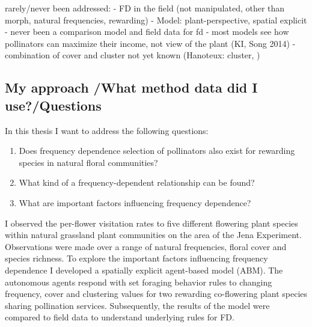 rarely/never been addressed: 
- FD in the field (not manipulated, other than morph, natural frequencies, rewarding)
- Model: plant-perspective, spatial explicit
- never been a comparison model and field data for fd
- most models see how pollinators can maximize their income, not view of the plant (KI, Song 2014)
- combination of cover and cluster not yet known (Hanoteux: cluster, )


\subsection*{My approach /What method data did I use?/Questions}
In this thesis I want to address the following questions: 

\begin{enumerate}
	\item Does frequency dependence selection of pollinators also exist for rewarding species in natural floral communities? \\
	\item	What kind of a frequency-dependent relationship can be found?\\
	\item	What are important factors influencing frequency dependence?\\
\end{enumerate}

I observed the per-flower visitation rates to five different flowering plant species within natural grassland plant communities on the area of the Jena Experiment. Observations were made over a range of natural frequencies, floral cover and species richness. To explore the important factors influencing frequency dependence I developed a spatially explicit agent-based model (ABM). The autonomous agents respond with set foraging behavior rules to changing frequency, cover and clustering values for two rewarding co-flowering plant species sharing pollination services. 
Subsequently, the results of the model were compared to field data to understand underlying rules for FD. 

